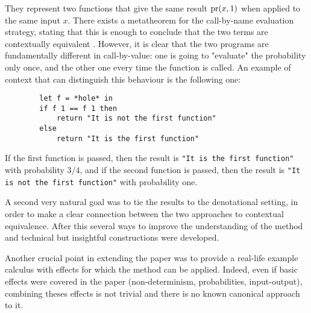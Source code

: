 They represent 
two functions that give the same result $\operatorname{pr} (x, 1)$ when 
applied to the same input $x$. There exists a metatheorem 
for the call-by-name evaluation strategy, stating that this is 
enough to conclude that the two terms are contextually equivalent
\cite{gom}. However, it is clear that the two programs are fundamentally 
different in call-by-value: one is going to "evaluate" the probability 
only once, and the other one every time the function is called. An example 
of context that can distinguish this behaviour is the following one:

\begin{verbatim}
        let f = *hole* in
        if f 1 == f 1 then 
            return "It is not the first function"
        else
            return "It is the first function"
\end{verbatim}

If the first function is passed, then the result is \texttt{"It is the first
function"} with probability
$3/4$, and if the second function is passed, then the result is \texttt{"It is
not the first function"} with probability one.

A second very 
natural goal was to tie the results to the denotational 
setting, in order to make a clear connection between 
the two approaches to contextual equivalence.
After this several ways to improve 
the understanding of the method and technical but insightful 
constructions were developed. 

Another crucial point in extending the paper was to provide 
a real-life example calculus with effects for which 
the method can be applied. Indeed, even if basic effects
were covered in the paper (non-determinism, probabilities,
input-output), combining theses effects is not trivial
and there is no known canonical approach to it.





